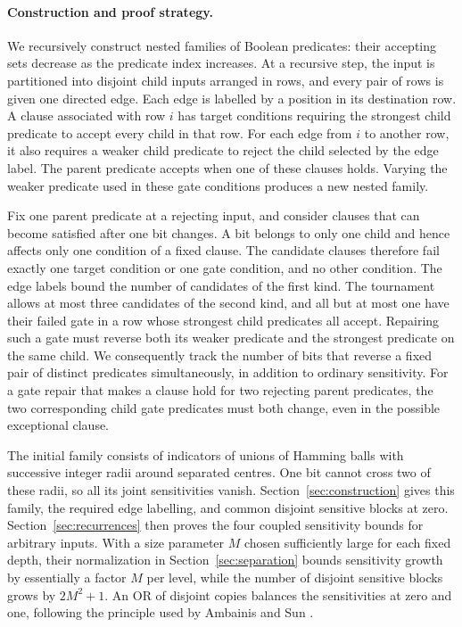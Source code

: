 \documentclass[11pt]{article}
\theoremstyle{definition}
\theoremstyle{remark}
\begin{document}
\paragraph{Construction and proof strategy.}
We recursively construct nested families of Boolean predicates: their
accepting sets decrease as the predicate index increases. At a recursive
step, the input is partitioned into disjoint child inputs arranged in
rows, and every pair of rows is given one directed edge. Each edge is
labelled by a position in its destination row. A clause associated with
row \(i\) has target conditions requiring the strongest child predicate
to accept every child in that row. For each edge from \(i\) to another row,
it also requires a weaker child predicate to reject the child selected by
the edge label. The parent predicate accepts when one of these clauses
holds. Varying the weaker predicate used in these gate conditions produces
a new nested family.

Fix one parent predicate at a rejecting input, and consider clauses that
can become satisfied after one bit changes. A bit belongs to only one child
and hence affects only one condition of a fixed clause. The candidate
clauses therefore fail exactly one target condition or one gate condition,
and no other condition. The edge labels bound the number of candidates of
the first kind. The tournament allows at most three candidates of the
second kind, and all but at most one have their failed gate in a row whose
strongest child predicates all accept. Repairing such a gate must reverse
both its weaker predicate and the strongest predicate on the same child.
We consequently track the number of bits that reverse a fixed pair of
distinct predicates simultaneously, in addition to ordinary sensitivity.
For a gate repair that makes a clause hold for two rejecting parent
predicates, the two corresponding child gate predicates must both change,
even in the possible exceptional clause.

The initial family consists of indicators of unions of Hamming balls
with successive integer radii around separated centres. One bit cannot
cross two of these radii, so all its joint sensitivities vanish.
Section~\ref{sec:construction} gives this family, the required edge
labelling, and common disjoint sensitive blocks at zero.
Section~\ref{sec:recurrences} then proves the four coupled sensitivity
bounds for arbitrary inputs. With a size parameter \(M\) chosen
sufficiently large for each fixed depth, their normalization in
Section~\ref{sec:separation} bounds sensitivity growth by essentially
a factor \(M\) per level, while the number of disjoint sensitive blocks
grows by \(2M^2+1\). An OR of disjoint copies balances the sensitivities
at zero and one, following the principle used by Ambainis and Sun
\cite[Section~4, Lemma~1]{AmbainisSun2011}.
\end{document}
